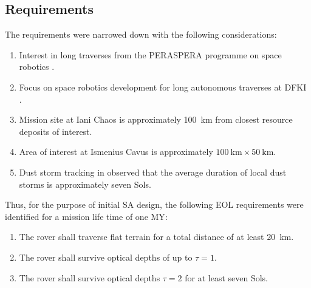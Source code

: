 
\subsection{Requirements}
\label{sec:sec:Design:RequirementsAndDesignDrivers:Requirements}
The requirements were narrowed down with the following considerations:

\begin{enumerate}[label=\textbf{\textcolor{BulletBlue}{(\alph*)}}]
    \item Interest in long traverses from the PERASPERA programme on space robotics .
    \item Focus on space robotics development for long autonomous traverses at \ac{DFKI}  .
    \item Mission site at Iani Chaos is approximately \SI{100}{\kilo\meter} from closest resource deposits of interest.
    \item Area of interest at Ismenius Cavus is approximately $\SI{100}{\kilo\meter} \times \SI{50}{\kilo\meter}$.
    \item Dust storm tracking in  observed that the average duration of local dust storms is approximately seven Sols.
\end{enumerate}

Thus, for the purpose of initial \ac{SA} design, the following \ac{EOL} requirements were identified for a mission life time of one \ac{MY}:

\begin{enumerate}[label=\textbf{\textcolor{BulletBlue}{R-\arabic*}}]
    \item \label{itm:req:total_distance_flat_terrain} The rover shall traverse flat terrain for a total distance of at least \SI{20}{\kilo\meter}.
    \item \label{itm:req:survive_tau1} The rover shall survive optical depths of up to $\tau = 1$.
    \item \label{itm:req:survice_tau2} The rover shall survive optical depths $\tau = 2$ for at least seven Sols.
\end{enumerate}

